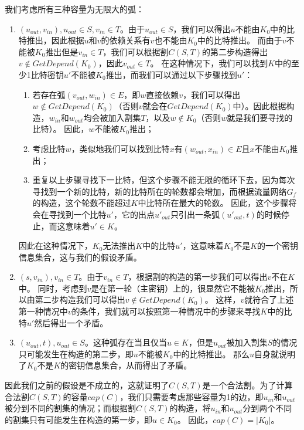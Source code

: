 我们考虑所有三种容量为无限大的弧：
\begin{enumerate}
    \item $(u_{out},v_{in}),u_{out}\in S,v_{in}\in T$。由于$u_{out}\in S$，我们可以得出$u$不能由$K_0$中的比特推出，因此根据$u$和$v$的依赖关系有$v$也不能由$K_0$中的比特推出。
        而由于$v$不能被$K_0$推出但是$v_{in}\in T$，我们可以根据割$C(S,T)$的第二步构造得出$v\notin GetDepend(K_0)$，因此$v_{out}\in T$。
        在这种情况下，我们可以找到$K$中的至少1比特密钥$u'$不能被$K_0$推出，而我们可以通过以下步骤找到$u'$：
        \begin{enumerate}
            \item 若存在弧$(v_{out},w_{in})\in E$，即$w$直接依赖$v$，我们可以得出$w\notin GetDepend(K_0)$（否则$v$就会在$GetDepend(K_0)$中）。因此根据构造，$w_{in}$和$w_{out}$均会被加入割集$T$，以及$w\notin K_0$（否则$w$就是我们要寻找的比特）。
                因此，$w$不能被$K_0$推出；
            \item 考虑比特$w$，类似地我们可以找到比特$x$有$(w_{out},x_{in})\in E$且$x$不能由$K_0$推出；
            \item 重复以上步骤寻找下一比特，但这个步骤不能无限的循环下去，因为每次寻找到一个新的比特，新的比特所在的轮数都会增加，而根据流量网络$G_f$的构造，这个轮数不能超过$K$中比特所在最大的轮数。
                因此，这个步骤将会在寻找到一个比特$u'$，它的出点$u'_{out}$只引出一条弧$(u'_{out},t)$的时候停止，而这意味着$u'\in K$。
        \end{enumerate}
        因此在这种情况下，$K_0$无法推出$K$中的比特$u'$，这意味着$K_0$不是$K$的一个密钥信息集合，这与我们的假设矛盾。
    \item $(s,v_{in}),v_{in}\in T$。由于$v_{in}\in T$，根据割的构造的第一步我们可以得出$v$不在$K$中。
        同时，考虑到$v$是在第一轮（主密钥）上的，很显然它不能被$K_0$推出，所以由第二步构造我们可以得出$v\notin GetDepend(K_0)$。
        这样，$v$就符合了上述第一种情况中$v$的条件，我们就可以按照第一种情况中的步骤来寻找$K$中的比特$u'$然后得出一个矛盾。
    \item $(u_{out},t),u_{out}\in S$。这种弧存在当且仅当$u\in K$，但是$u_{out}$被加入割集$S$的情况只可能发生在构造的第二步，即$u$不能被$K_0$中的比特推出。
        那么$u$自身就说明了$K_0$不是$K$的密钥信息集合，从而得出了矛盾。
\end{enumerate}

因此我们之前的假设是不成立的，这就证明了$C(S,T)$是一个合法割。为了计算合法割$C(S,T)$的容量$cap(C)$，我们只需要考虑那些容量为1的边，即$u_{in}$和$u_{out}$被分到不同的割集的情况；而根据割$C(S,T)$的构造，将$u_{in}$和$u_{out}$分到两个不同的割集只有可能发生在构造的第一步，即$u\in K_0$。
因此，$cap(C)=|K_0|$。

